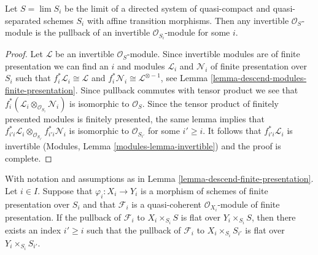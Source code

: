 \begin{lemma}
\label{lemma-descend-invertible-modules}
Let $S = \lim S_i$ be the limit of a directed system of quasi-compact and
quasi-separated schemes $S_i$ with affine transition morphisms. Then any
invertible $\mathcal{O}_S$-module is the pullback of an invertible
$\mathcal{O}_{S_i}$-module for some $i$.
\end{lemma}

\begin{proof}
Let $\mathcal{L}$ be an invertible $\mathcal{O}_S$-module. Since
invertible modules are of finite presentation we can find an $i$
and modules $\mathcal{L}_i$ and $\mathcal{N}_i$ of finite presentation
over $S_i$ such that $f_i^*\mathcal{L}_i \cong \mathcal{L}$ and
$f_i^*\mathcal{N}_i \cong \mathcal{L}^{\otimes -1}$, see
Lemma \ref{lemma-descend-modules-finite-presentation}.
Since pullback commutes with tensor product we see that
$f_i^*(\mathcal{L}_i \otimes_{\mathcal{O}_{S_i}} \mathcal{N}_i)$
is isomorphic to $\mathcal{O}_S$. Since the tensor product of
finitely presented modules is finitely presented, the same
lemma implies that
$f_{i'i}^*\mathcal{L}_i
\otimes_{\mathcal{O}_{S_{i'}}} f_{i'i}^*\mathcal{N}_i$
is isomorphic to $\mathcal{O}_{S_{i'}}$ for some $i' \geq i$.
It follows that $f_{i'i}^*\mathcal{L}_i$ is invertible
(Modules, Lemma \ref{modules-lemma-invertible}) and the proof is complete.
\end{proof}

\begin{lemma}
\label{lemma-descend-module-flat-finite-presentation}
With notation and assumptions as in
Lemma \ref{lemma-descend-finite-presentation}.
Let $i \in I$.
Suppose that $\varphi_i : X_i \to Y_i$ is a morphism of schemes
of finite presentation over $S_i$ and that $\mathcal{F}_i$ is a
quasi-coherent $\mathcal{O}_{X_i}$-module of finite presentation.
If the pullback of $\mathcal{F}_i$ to $X_i \times_{S_i} S$ is flat
over $Y_i \times_{S_i} S$, then there exists an index $i' \geq i$
such that the pullback of $\mathcal{F}_i$ to $X_i \times_{S_i} S_{i'}$
is flat over $Y_i \times_{S_i} S_{i'}$.
\end{lemma}

